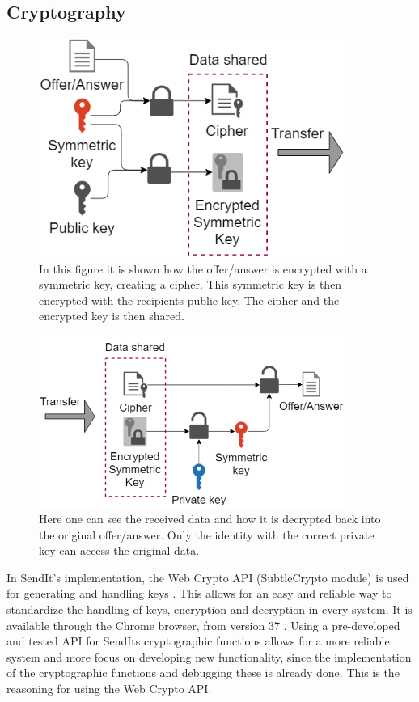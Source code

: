 	\subsection{Cryptography}
	\label{sec:crypto}
%
	\begin{figure}[th]
	  \centering
	  \includegraphics[width=100mm]{Figures/Encrypt}
	  \decoRule
	  \caption[Authentication exchange encryption]{In this figure it is shown how the offer/answer is encrypted with a symmetric key, creating a cipher. This symmetric key is then encrypted with the recipients public key. The cipher and the encrypted key is then shared.}
	  \label{fig:enc}
	\end{figure}
	\begin{figure}[th]
	  \centering
	  \includegraphics[width=100mm]{Figures/Decrypt}
	  \decoRule
	  \caption[Authentication exchange decryption]{Here one can see the received data and how it is decrypted back into the original offer/answer. Only the identity with the correct private key can access the original data.}
	  \label{fig:decr}
	\end{figure}

	In SendIt's implementation, the Web Crypto API (SubtleCrypto module) is used for generating and handling keys \cite{ar_webcrypto}. This allows for an easy and reliable way to standardize the handling of keys, encryption and decryption in every system. It is available through the Chrome browser, from version 37 \cite{url_webcr_supp}. Using a pre-developed and tested API for SendIts cryptographic functions allows for a more reliable system and more focus on developing new functionality, since the implementation of the cryptographic functions and debugging these is already done. This is the reasoning for using the Web Crypto API.

